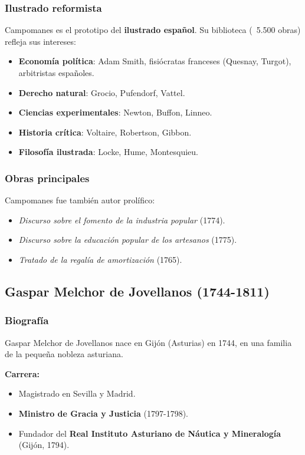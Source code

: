 \documentclass[11pt,a4paper]{article}
\begin{document}
\subsubsection{Ilustrado reformista}

Campomanes es el prototipo del \textbf{ilustrado español}. Su biblioteca (~5.500 obras) refleja sus intereses:

\begin{itemize}
\item \textbf{Economía política}: Adam Smith, fisiócratas franceses (Quesnay, Turgot), arbitristas españoles.
\item \textbf{Derecho natural}: Grocio, Pufendorf, Vattel.
\item \textbf{Ciencias experimentales}: Newton, Buffon, Linneo.
\item \textbf{Historia crítica}: Voltaire, Robertson, Gibbon.
\item \textbf{Filosofía ilustrada}: Locke, Hume, Montesquieu.
\end{itemize}

\subsubsection{Obras principales}

Campomanes fue también autor prolífico:
\begin{itemize}
\item \textit{Discurso sobre el fomento de la industria popular} (1774).
\item \textit{Discurso sobre la educación popular de los artesanos} (1775).
\item \textit{Tratado de la regalía de amortización} (1765).
\end{itemize}

\subsection{Gaspar Melchor de Jovellanos (1744-1811)}

\subsubsection{Biografía}

Gaspar Melchor de Jovellanos nace en Gijón (Asturias) en 1744, en una familia de la pequeña nobleza asturiana.

\textbf{Carrera:}
\begin{itemize}
\item Magistrado en Sevilla y Madrid.
\item \textbf{Ministro de Gracia y Justicia} (1797-1798).
\item Fundador del \textbf{Real Instituto Asturiano de Náutica y Mineralogía} (Gijón, 1794).
\end{itemize}
\end{document}
